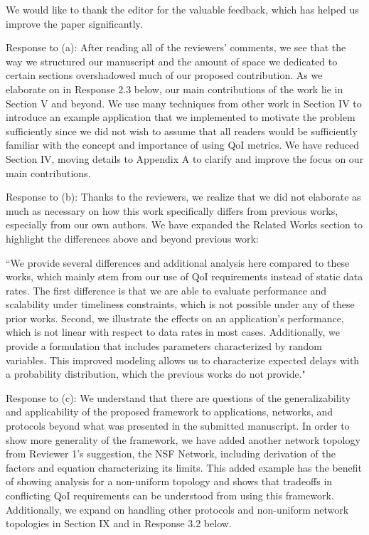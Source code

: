 \documentclass[12pt, letterpaper, onecolumn]{IEEEtran}
\begin{document}
{\color {blue}
We would like to thank the editor for the valuable feedback, which has helped us improve the paper significantly.

Response to (a): After reading all of the reviewers' comments, we see that the way we structured our manuscript and the amount of space we dedicated to certain sections overshadowed much of our proposed contribution. As we elaborate on in Response 2.3 below, our main contributions of the work lie in Section V and beyond. We use many techniques from other work in Section IV to introduce an example application that we implemented to motivate the problem sufficiently since we did not wish to assume that all readers would be sufficiently familiar with the concept and importance of using QoI metrics. We have reduced Section IV, moving details to Appendix A to clarify and improve the focus on our main contributions. 
\ \newline

Response to (b): Thanks to the reviewers, we realize that we did not elaborate as much as necessary on how this work specifically differs from previous works, especially from our own authors. We have expanded the Related Works section to highlight the differences above and beyond previous work:

``We provide several differences and additional analysis here compared to these works, which mainly stem from our use of QoI requirements instead of static data rates. The first difference is that we are able to evaluate performance and scalability under timeliness constraints, which is not possible under any of these prior works. Second, we illustrate the effects on an application's performance, which is not linear with respect to data rates in most cases. Additionally, we provide a formulation that includes parameters characterized by random variables. This improved modeling allows us to characterize expected delays with a probability distribution, which the previous works do not provide."
\ \newline

Response to (c): We understand that there are questions of the generalizability and applicability of the proposed framework to applications, networks, and protocols beyond what was presented in the submitted manuscript. In order to show more generality of the framework, we have added another network topology from Reviewer 1's suggestion, the NSF Network, including derivation of the factors and equation characterizing its limits. This added example has the benefit of showing analysis for a non-uniform topology and shows that tradeoffs in conflicting QoI requirements can be understood from using this framework. Additionally, we expand on handling other protocols and non-uniform network topologies in Section IX and in Response 3.2 below.
}
\end{document}
